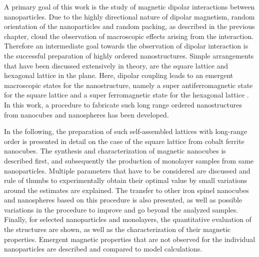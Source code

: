 \documentclass[\main/dresen_thesis.tex]{subfiles}
\begin{document}
  A primary goal of this work is the study of magnetic dipolar interactions between nanoparticles.
  Due to the highly directional nature of dipolar magnetism, random orientation of the nanoparticles and random packing, as described in the previous chapter, cloud the observation of macroscopic effects arising from the interaction.
  Therefore an intermediate goal towards the observation of dipolar interaction is the successful preparation of highly ordered nanostructures.
  Simple arrangements that have been discussed extensively in theory, are the square lattice and hexagonal lattice in the plane.
  Here, dipolar coupling leads to an emergent macroscopic states for the nanostructure, namely a super antiferromagnetic state for the square lattice and a super ferromagnetic state for the hexagonal lattice \cite{Politi_2002_Dipol, Russier_2001_Calcu, Varon_2013_Dipol}.
  In this work, a procedure to fabricate such long range ordered nanostructures from nanocubes and nanospheres has been developed.

  In the following, the preparation of such self-assembled lattices with long-range order is presented in detail on the case of the square lattice from cobalt ferrite nanocubes.
  The synthesis and characterization of magnetic nanocubes is described first, and subsequently the production of monolayer samples from same nanoparticles.
  Multiple parameters that have to be considered are discussed and rule of thumbs to experimentally obtain their optimal value by small variations around the estimates are explained.
  The transfer to other iron spinel nanocubes and nanospheres based on this procedure is also presented, as well as possible variations in the procedure to improve and go beyond the analyzed samples.
  Finally, for selected nanoparticles and monolayers, the quantitative evaluation of the structures are shown, as well as the characterization of their magnetic properties. Emergent magnetic properties that are not observed for the individual nanoparticles are described and compared to model calculations.
\end{document}
